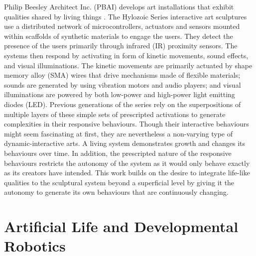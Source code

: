 Philip Beesley Architect Inc. (PBAI) develops art installations that exhibit qualities shared by living things \cite{Gorbet2015}. The Hylozoic Series interactive art sculptures use a distributed network of microcontrollers, actuators and sensors mounted within scaffolds of synthetic materials to engage the users. They detect the presence of the users primarily through infrared (IR) proximity sensors. The systems then respond by activating in form of kinetic movements, sound effects, and visual illuminations. The kinetic movements are primarily actuated by shape memory alloy (SMA) wires that drive mechanisms made of flexible materials; sounds are generated by using vibration motors and audio players; and visual illuminations are powered by both low-power and high-power light emitting diodes (LED). Previous generations of the series \cite{Beesley2012} rely on the superpositions of multiple layers of these simple sets of prescripted activations to generate complexities in their responsive behaviours. %
Though their interactive behaviours might seem fascinating at first, they are nevertheless a non-varying type of dynamic-interactive arts. A living system demonstrates growth and changes its behaviours over time. In addition, the prescripted nature of the responsive behaviours restricts the autonomy of the system as it would only behave exactly as its creators have intended. This work builds on the desire to integrate life-like qualities to the sculptural system beyond a superficial level by giving it the autonomy to generate its own behaviours that are continuously changing.


\section{Artificial Life and Developmental Robotics}

